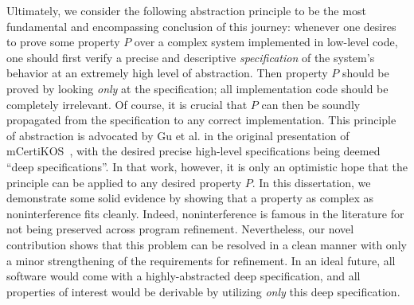 Ultimately, we consider the following abstraction principle to be the most
fundamental and encompassing conclusion of this journey: whenever
one desires to prove some property $P$ over a complex system implemented
in low-level code, one should first verify a precise and descriptive
\emph{specification} of the system's behavior at an extremely high level 
of abstraction. Then property $P$ should be proved by looking \emph{only}
at the specification; all implementation code should be completely irrelevant. 
Of course, it is crucial that $P$ can then be soundly propagated from the specification 
to any correct implementation. This principle of abstraction is advocated
by Gu et al. in the original presentation of mCertiKOS~\cite{certikos-popl},
with the desired precise high-level specifications being deemed ``deep
specifications''. In that work, however, it is only an optimistic hope that
the principle can be applied to any desired property $P$. In this dissertation,
we demonstrate some solid evidence by showing that a property as complex as 
noninterference fits cleanly. Indeed, noninterference is famous in the
literature for not being preserved across program refinement. Nevertheless,
our novel contribution shows that this problem can be resolved in a clean
manner with only a minor strengthening of the requirements for refinement.
In an ideal future, all software would come with a highly-abstracted deep 
specification, and all properties of interest would be derivable
by utilizing \emph{only} this deep specification.


